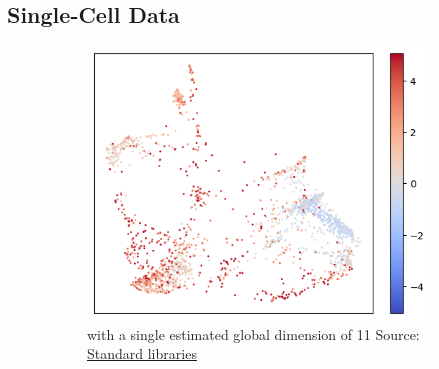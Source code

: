 \documentclass[
  letterpaper,
  DIV=11,
  numbers=noendperiod]{scrartcl}
\theoremstyle{plain}
\theoremstyle{definition}
\theoremstyle{definition}
\theoremstyle{plain}
\theoremstyle{plain}
\theoremstyle{remark}
\begin{document}
\subsection{Single-Cell Data}\label{single-cell-data}

\begin{figure}

\begin{minipage}[t]{0.50\linewidth}

{\centering 

\begin{figure}[H]

{\centering \includegraphics{index_files/figure-latex/fig-single-cell-global-output-1.png}

}

\caption{with a single estimated global dimension of 11 Source:
\href{https://professorwug.github.io/diffusion-curvature//Users/adjourner/Pumberton/Workshop/21-SUMRY-Curvature/diffusion-curvature/nbs/9-single-cell-results.ipynb.html\#cell-fig-single-cell-global}{Standard
libraries}}

\end{figure}

}

\end{minipage}%
%
\begin{minipage}[t]{0.50\linewidth}

{\centering 

\begin{figure}[H]


\end{figure}}
\end{minipage}
\end{figure}
\end{document}
